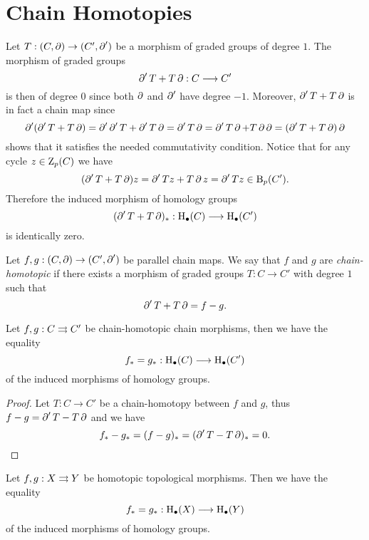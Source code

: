 \section{Chain Homotopies}

Let \(T: (C, \operatorname{\partial}) \to (C', \operatorname{\partial}')\) be a morphism of
graded groups of degree \(1\). The morphism of graded groups
\[
    \operatorname{\partial}' T + T \operatorname{\partial}: C \longrightarrow C'
\]
is then of degree \(0\) since both \(\operatorname{\partial}\) and \(\operatorname{\partial}'\) have degree
\(-1\). Moreover, \(\operatorname{\partial}' T + T \operatorname{\partial}\) is in fact a chain map since
\[
    \operatorname{\partial}'(\operatorname{\partial}' T + T \operatorname{\partial})
    = \operatorname{\partial}' \operatorname{\partial}' T + \operatorname{\partial}' T \operatorname{\partial}
    = \operatorname{\partial}' T \operatorname{\partial}
    = \operatorname{\partial}' T \operatorname{\partial} + T \operatorname{\partial} \operatorname{\partial}
    = (\operatorname{\partial}' T + T \operatorname{\partial}) \operatorname{\partial}
\]
shows that it satisfies the needed commutativity condition. Notice that for any
cycle \(z \in \operatorname{Z}_p(C)\) we have
\[
    (\operatorname{\partial}' T + T \operatorname{\partial}) z = \operatorname{\partial}' T z + T \operatorname{\partial} z = \operatorname{\partial}' T z \in \operatorname{B}_p(C').
\]
Therefore the induced morphism of homology groups
\[
    (\operatorname{\partial}' T + T \operatorname{\partial})_{*}: \operatorname{H}_{\bullet}(C) \longrightarrow \operatorname{H}_{\bullet}(C')
\]
is identically zero.

\begin{definition}
    \label{def:chain-homotopic-maps}
    Let \(f, g: (C, \operatorname{\partial}) \to (C', \operatorname{\partial}')\) be parallel chain
    maps. We say that \(f\) and \(g\) are \emph{chain-homotopic} if there exists a
    morphism of graded groups \(T: C \to C'\) with degree \(1\)
    such that
    \[
        \operatorname{\partial}' T + T \operatorname{\partial} = f - g.
    \]
\end{definition}

\begin{proposition}
    \label{prop:homotopic-chain-maps-equal-induced-homology-morphisms}
    Let \(f, g: C \rightrightarrows C'\) be chain-homotopic chain morphisms, then we have the
    equality
    \[
        f_{*} = g_{*}: \operatorname{H}_{\bullet}(C) \longrightarrow \operatorname{H}_{\bullet}(C')
    \]
    of the induced morphisms of homology groups.
\end{proposition}

\begin{proof}
    Let \(T: C \to C'\) be a chain-homotopy between \(f\) and \(g\), thus \(f - g =
    \operatorname{\partial}' T - T \operatorname{\partial}\) and we have
    \[
        f_{*} - g_{*} = (f - g)_{*} = (\operatorname{\partial}' T - T \operatorname{\partial})_{*} = 0.
    \]
\end{proof}

\begin{theorem}
    \label{thm:homotopic-maps-equal-induced-homology-morphism}
    Let \(f, g: X \rightrightarrows Y\) be homotopic topological morphisms. Then we have the
    equality
    \[
        f_{*} = g_{*}: \operatorname{H}_{\bullet}(X) \longrightarrow \operatorname{H}_{\bullet}(Y)
    \]
    of the induced morphisms of homology groups.
\end{theorem}


